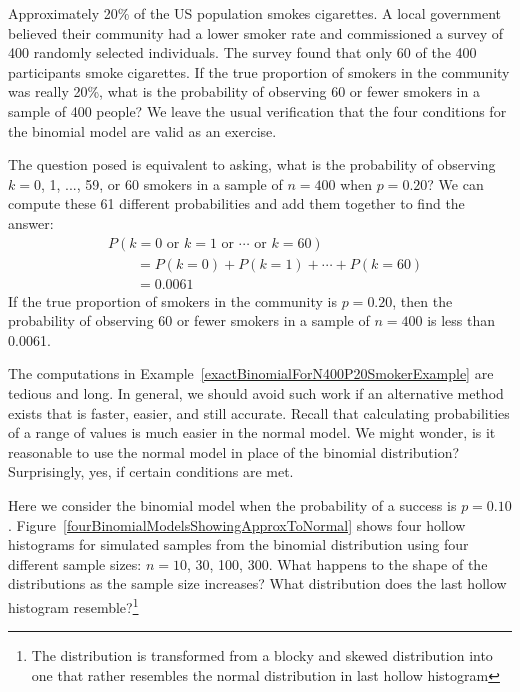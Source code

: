 \begin{example}{Approximately 20\% of the US population smokes cigarettes. A local government believed their community had a lower smoker rate and commissioned a survey of 400 randomly selected individuals. The survey found that only 60 of the 400 participants smoke cigarettes. If the true proportion of smokers in the community was really 20\%, what is the probability of observing 60 or fewer smokers in a sample of 400 people?}\label{exactBinomialForN400P20SmokerExample}
We leave the usual verification that the four conditions for the binomial model are valid as an exercise.

The question posed is equivalent to asking, what is the probability of observing $k=0$, 1, ..., 59, or 60 smokers in a sample of $n=400$ when $p=0.20$? We can compute these 61 different probabilities and add them together to find the answer:
\begin{align*}
&P(k=0\text{ or }k=1\text{ or } \cdots \text{ or } k=60) \\
	&\qquad= P(k=0) + P(k=1) + \cdots + P(k=60) \\
	&\qquad=0.0061
\end{align*}
If the true proportion of smokers in the community is $p=0.20$, then the probability of observing 60 or fewer smokers in a sample of $n=400$ is less than 0.0061.
\end{example}

The computations in Example~\ref{exactBinomialForN400P20SmokerExample} are tedious and long. In general, we should avoid such work if an alternative method exists that is faster, easier, and still accurate. Recall that calculating probabilities of a range of values is much easier in the normal model. We might wonder, is it reasonable to use the normal model in place of the binomial distribution? Surprisingly, yes, if certain conditions are met.

\begin{exercise}
Here we consider the binomial model when the probability of a success is $p=0.10$. Figure~\ref{fourBinomialModelsShowingApproxToNormal} shows four hollow histograms for simulated samples from the binomial distribution using four different sample sizes: $n=10$, 30, 100, 300. What happens to the shape of the distributions as the sample size increases? What distribution does the last hollow histogram resemble?\footnote{The distribution is transformed from a blocky and skewed distribution into one that rather resembles the normal distribution in last hollow histogram}
\end{exercise}

